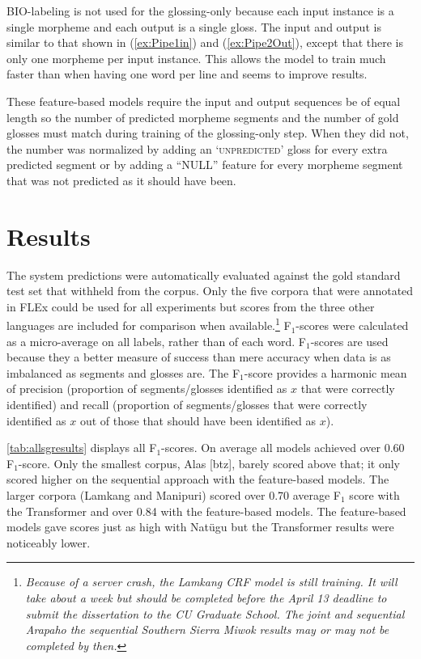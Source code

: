 BIO-labeling is not used for the glossing-only because each input instance is a single morpheme and each output is a single gloss. The input and output is similar to that shown in (\ref{ex:Pipe1in}) and (\ref{ex:Pipe2Out}), except that there is only one morpheme per input instance. This allows the model to train much faster than when having one word per line and seems to improve results.

These feature-based models require the input and output sequences be of equal length so the number of predicted morpheme segments and the number of gold glosses must match during training of the glossing-only step. When they did not, the number was normalized by adding an `\textsc{unpredicted}' gloss for every extra predicted segment or by adding a ``NULL'' feature for every morpheme segment that was not predicted as it should have been. 


\section{Results}
\label{sec:sgresults}

The system predictions were automatically evaluated against the gold standard test set that withheld from the corpus. Only the five corpora that were annotated in FLEx could be used for all experiments but scores from the three other languages are included for comparison when available.\footnote{\textit{Because of a server crash, the Lamkang CRF model is still training. It will take about a week but should be completed before the April 13 deadline to submit the dissertation to the CU Graduate School. The joint and sequential Arapaho the sequential Southern Sierra Miwok results may or may not be completed by then.}} F$_1$-scores were calculated as a micro-average on all labels, rather than of each word. F$_1$-scores are used because they a better measure of success than mere accuracy when data is as imbalanced as segments and glosses are. The F$_1$-score provides a harmonic mean of precision (proportion of segments/glosses identified as $x$ that were correctly identified) and recall (proportion of segments/glosses that were correctly identified as $x$ out of those that should have been identified as $x$). 

\autoref{tab:allsgresults} displays all F$_1$-scores. On average all models achieved over 0.60 F$_1$-score. Only the smallest corpus, Alas [btz], barely scored above that; it only scored higher on the sequential approach with the feature-based models. The larger corpora (Lamkang and Manipuri) scored over 0.70 average F$_1$ score with the Transformer and over 0.84 with the feature-based models. The feature-based models gave scores just as high with Nat\"ugu but the Transformer results were noticeably lower.

